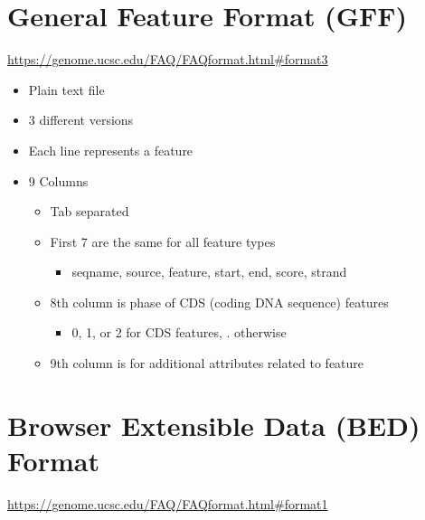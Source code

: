 \documentclass[
]{book}
\providecommand{\tightlist}{%
  \setlength{\itemsep}{0pt}\setlength{\parskip}{0pt}}
\begin{document}
\hypertarget{general-feature-format-gff}{%
\section{General Feature Format (GFF)}\label{general-feature-format-gff}}

\url{https://genome.ucsc.edu/FAQ/FAQformat.html\#format3}

\begin{itemize}
\tightlist
\item
  Plain text file
\item
  3 different versions
\item
  Each line represents a feature
\item
  9 Columns

  \begin{itemize}
  \tightlist
  \item
    Tab separated
  \item
    First 7 are the same for all feature types

    \begin{itemize}
    \tightlist
    \item
      seqname, source, feature, start, end, score, strand
    \end{itemize}
  \item
    8th column is phase of CDS (coding DNA sequence) features

    \begin{itemize}
    \tightlist
    \item
      0, 1, or 2 for CDS features, . otherwise
    \end{itemize}
  \item
    9th column is for additional attributes related to feature
  \end{itemize}
\end{itemize}

\hypertarget{browser-extensible-data-bed-format}{%
\section{Browser Extensible Data (BED) Format}\label{browser-extensible-data-bed-format}}

\url{https://genome.ucsc.edu/FAQ/FAQformat.html\#format1}
\end{document}
